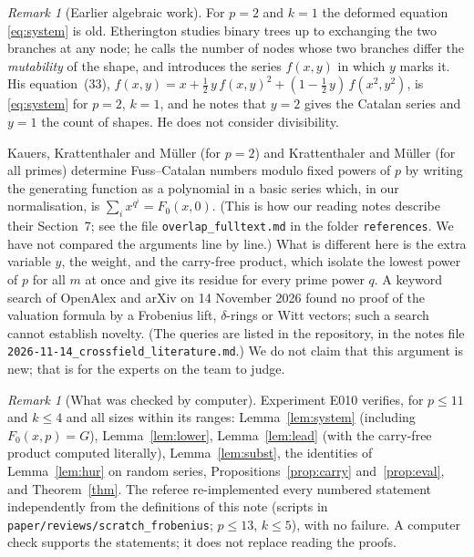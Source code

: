 \documentclass[11pt]{article}
\theoremstyle{definition}
\theoremstyle{remark}
\newtheorem{remark}[theorem]{Remark}
\begin{document}
\begin{remark}[Earlier algebraic work]
For $p=2$ and $k=1$ the deformed equation \eqref{eq:system} is old. Etherington \cite{Eth}
studies binary trees up to exchanging the two branches at any node; he calls the number of
nodes whose two branches differ the \emph{mutability} of the shape, and introduces the series
$f(x,y)$ in which $y$ marks it. His equation~(33),
$f(x,y)=x+\tfrac12\,y\,f(x,y)^2+(1-\tfrac12\,y)\,f(x^2,y^2)$, is \eqref{eq:system} for $p=2$,
$k=1$, and he notes that $y=2$ gives the Catalan series and $y=1$ the count of shapes. He
does not consider divisibility.

Kauers, Krattenthaler and M\"uller \cite{KKM} (for $p=2$) and Krattenthaler and M\"uller
\cite{KM} (for all primes) determine Fuss--Catalan numbers modulo fixed powers of
$p$ by writing the generating function as a polynomial in a basic series which, in our
normalisation, is $\sum_ix^{q^i}=F_0(x,0)$. (This is how our reading notes describe their
Section~7; see the file \texttt{overlap\_fulltext.md} in the folder \texttt{references}. We
have not compared the arguments line by line.) What is different here is the extra variable $y$, the weight, and
the carry-free product, which isolate the lowest power of $p$ for all $m$ at once and give
its residue for every prime power $q$. A keyword search of OpenAlex and arXiv on 14 November
2026 found no proof of the valuation formula by a Frobenius lift, $\delta$-rings or Witt
vectors; such a search cannot establish novelty. (The queries are listed in the repository,
in the notes file \nolinkurl{2026-11-14_crossfield_literature.md}.) We do not claim that this argument is new; that is for the
experts on the team to judge.
\end{remark}

\begin{remark}[What was checked by computer]
Experiment E010 verifies, for $p\le11$ and $k\le4$ and all sizes within its ranges:
Lemma~\ref{lem:system} (including $F_0(x,p)=G$), Lemma~\ref{lem:lower},
Lemma~\ref{lem:lead} (with the carry-free product computed literally),
Lemma~\ref{lem:subst}, the identities of Lemma~\ref{lem:hur} on random series,
Propositions~\ref{prop:carry} and~\ref{prop:eval}, and Theorem~\ref{thm}. The referee
re-implemented every numbered statement independently from the definitions of this note
(scripts in \texttt{paper/reviews/scratch\_frobenius}; $p\le13$, $k\le5$), with no failure.
A computer check supports the statements; it does not replace reading the proofs.
\end{remark}
\end{document}
